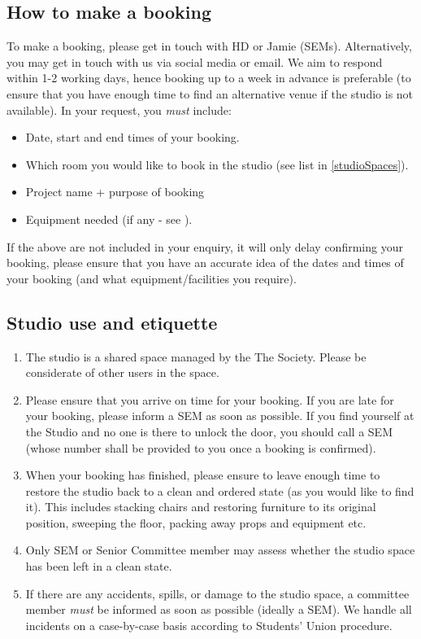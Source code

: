 \documentclass[]{article}
\begin{document}
\subsection{How to make a booking}
To make a booking, please get in touch with HD or Jamie (SEMs). Alternatively, you may get in touch with us via social media or email. We aim to respond within 1-2 working days, hence booking up to a week in advance is preferable (to ensure that you have enough time to find an alternative venue if the studio is not available). In your request, you \textit{must} include:
\begin{itemize}
    \item Date, start and end times of your booking.
    \item Which room you would like to book in the studio (see list in \ref{studioSpaces}).
    \item Project name + purpose of booking
    \item Equipment needed (if any - see ).
\end{itemize}
If the above are not included in your enquiry, it will only delay confirming your booking, please ensure that you have an accurate idea of the dates and times of your booking (and what equipment/facilities you require).
\subsection{Studio use and etiquette}
\begin{enumerate}
    \item The studio is a shared space managed by the The Society. Please be considerate of other users in the space.
    \item Please ensure that you arrive on time for your booking. If you are late for your booking, please inform a SEM as soon as possible. If you find yourself at the Studio and no one is there to unlock the door, you should call a SEM (whose number shall be provided to you once a booking is confirmed).
    \item When your booking has finished, please ensure to leave enough time to restore the studio back to a clean and ordered state (as you would like to find it). This includes stacking chairs and restoring furniture to its original position, sweeping the floor, packing away props and equipment etc.
    \item Only SEM or Senior Committee member may assess whether the studio space has been left in a clean state.
    \item If there are any accidents, spills, or damage to the studio space, a committee member \textit{must} be informed as soon as possible (ideally a SEM). We handle all incidents on a case-by-case basis according to Students' Union procedure.
\end{enumerate}
\end{document}
